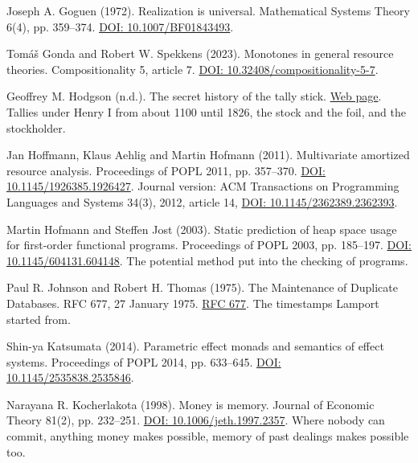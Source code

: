 \documentclass[11pt,twoside]{article}
\theoremstyle{thielethm}
\theoremstyle{thieledef}
\theoremstyle{thieledef}
\theoremstyle{thieledef}
\theoremstyle{thielethm}
\theoremstyle{thieleobs}
\theoremstyle{thielethm}
\begin{document}
\noindent Joseph A. Goguen (1972). Realization is universal. Mathematical Systems Theory 6(4), pp. 359--374. \href{https://doi.org/10.1007/BF01843493}{DOI: 10.1007/BF01843493}.
\par\medskip

\noindent Tom\'a\v{s} Gonda and Robert W. Spekkens (2023). Monotones in general resource theories. Compositionality 5, article 7. \href{https://doi.org/10.32408/compositionality-5-7}{DOI: 10.32408/compositionality-5-7}.
\par\medskip

\noindent Geoffrey M. Hodgson (n.d.). The secret history of the tally stick. \href{https://www.geoffreymhodgson.uk/secret-history-of-tally-stick}{Web page}. Tallies under Henry I from about 1100 until 1826, the stock and the foil, and the stockholder.
\par\medskip

\noindent Jan Hoffmann, Klaus Aehlig and Martin Hofmann (2011). Multivariate amortized resource analysis. Proceedings of POPL 2011, pp. 357--370. \href{https://doi.org/10.1145/1926385.1926427}{DOI: 10.1145/1926385.1926427}. Journal version: ACM Transactions on Programming Languages and Systems 34(3), 2012, article 14, \href{https://doi.org/10.1145/2362389.2362393}{DOI: 10.1145/2362389.2362393}.
\par\medskip

\noindent Martin Hofmann and Steffen Jost (2003). Static prediction of heap space usage for first-order functional programs. Proceedings of POPL 2003, pp. 185--197. \href{https://doi.org/10.1145/604131.604148}{DOI: 10.1145/604131.604148}. The potential method put into the checking of programs.
\par\medskip

\noindent Paul R. Johnson and Robert H. Thomas (1975). The Maintenance of Duplicate Databases. RFC 677, 27 January 1975. \href{https://www.rfc-editor.org/rfc/rfc677.html}{RFC 677}. The timestamps Lamport started from.
\par\medskip

\noindent Shin-ya Katsumata (2014). Parametric effect monads and semantics of effect systems. Proceedings of POPL 2014, pp. 633--645. \href{https://doi.org/10.1145/2535838.2535846}{DOI: 10.1145/2535838.2535846}.
\par\medskip

\noindent Narayana R. Kocherlakota (1998). Money is memory. Journal of Economic Theory 81(2), pp. 232--251. \href{https://doi.org/10.1006/jeth.1997.2357}{DOI: 10.1006/jeth.1997.2357}. Where nobody can commit, anything money makes possible, memory of past dealings makes possible too.
\par\medskip
\end{document}
